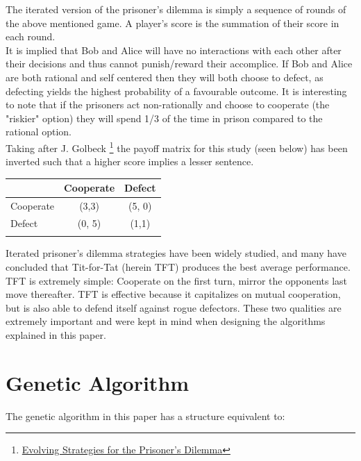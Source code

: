 \documentclass[12pt]{article}
\begin{document}
The iterated version of the prisoner's dilemma is simply a sequence of rounds of
the above mentioned game.  A player's score is the summation of their score in
each round. \\

It is implied that Bob and Alice will have no interactions with each other after
their decisions and thus cannot punish/reward their accomplice. If Bob and Alice are
both rational and self centered then they will both choose to defect, as defecting
yields the highest probability of a favourable outcome.  It is interesting to note
that if the prisoners act non-rationally and choose to cooperate
(the "riskier" option) they will spend 1/3 of the time in prison compared
to the rational option. \\

Taking after J. Golbeck
\footnote{\href{http://cgis.cs.umd.edu/~golbeck/downloads/JGolbeck\_prison.pdf}
{Evolving Strategies for the Prisoner's Dilemma}}
the payoff matrix for this study (seen below) has been
inverted such that a higher score implies a lesser sentence. \\

\begin{center}
    \begin{tabular}{l | c | c}
         & Cooperate & Defect \\
        \hline
        Cooperate & (3,3) & (5, 0)\\
        \hline
        Defect & (0, 5) & (1,1) \\ \\
    \end{tabular}
\end{center}

Iterated prisoner's dilemma strategies have been widely studied, and many have
concluded that Tit-for-Tat (herein TFT) produces the best average performance.
TFT is extremely simple: Cooperate on the first turn, mirror the opponents
last move thereafter.  TFT is effective because it capitalizes on mutual
cooperation, but is also able to defend itself against rogue defectors.  These
two qualities are extremely important and were kept in mind when designing the
algorithms explained in this paper.
\section{Genetic Algorithm}

The genetic algorithm in this paper has a structure equivalent to: \\
\end{document}
